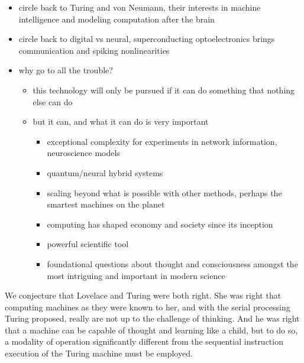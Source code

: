 \documentclass[twocolumn]{article}
\begin{document}
\begin{itemize}

\item circle back to Turing and von Neumann, their interests in machine intelligence and modeling computation after the brain
\item circle back to digital vs neural, superconducting optoelectronics brings communication and spiking nonlinearities

\item why go to all the trouble?
\begin{itemize}
\item this technology will only be pursued if it can do something that nothing else can do
\item but it can, and what it can do is very important
\begin{itemize}
\item exceptional complexity for experiments in network information, neuroscience models
\item quantum/neural hybrid systems
\item scaling beyond what is possible with other methods, perhaps the smartest machines on the planet
\item computing has shaped economy and society since its inception
\item powerful scientific tool
\item foundational questions about thought and consciousness amongst the most intriguing and important in modern science
\end{itemize}

\end{itemize}

\end{itemize}

\vspace{3em}
We conjecture that Lovelace and Turing were both right. She was right that computing machines as they were known to her, and with the serial processing Turing proposed, really are not up to the challenge of thinking. And he was right that a machine can be capable of thought and learning like a child, but to do so, a modality of operation significantly different from the sequential instruction execution of the Turing machine must be employed.
\end{document}
